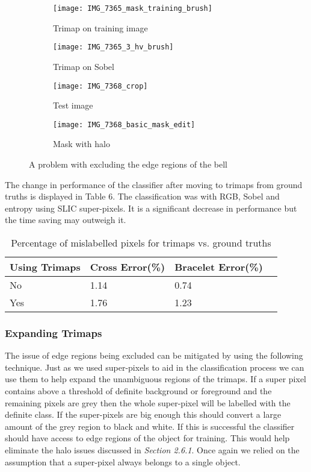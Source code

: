 \documentclass[12pt]{IIBproject}
\begin{document}
\begin{figure}[H]
\centering
\begin{subfigure}{.45\textwidth}
  \centering
  \texttt{[image: IMG\_7365\_mask\_training\_brush]}
  \caption{Trimap on training image}
  \label{fig:sub1}
\end{subfigure}%
\begin{subfigure}{.45\textwidth}
  \centering
  \texttt{[image: IMG\_7365\_3\_hv\_brush]}
  \caption{Trimap on Sobel}
  \label{fig:sub2}
\end{subfigure}
\begin{subfigure}{.45\textwidth}
  \centering
  \texttt{[image: IMG\_7368\_crop]}
  \caption{Test image}
  \label{fig:sub2}
\end{subfigure}
\begin{subfigure}{.45\textwidth}
  \centering
  \texttt{[image: IMG\_7368\_basic\_mask\_edit]}
  \caption{Mask with halo}
  \label{fig:sub2}
\end{subfigure}
\caption{A problem with excluding the edge regions of the bell}
\label{fig:test}
\end{figure}
The change in performance of the classifier after moving to trimaps from ground truths is displayed in Table 6. The classification was with RGB, Sobel and entropy using SLIC super-pixels. It is a significant decrease in performance but the time saving may outweigh it.
\begin{table}
\begin{center}
    \begin{tabular}{ | l | l | l | p{5cm} |}
    \hline
    Using Trimaps & Cross Error(\%) & Bracelet Error(\%) \\ \hline
    No & 1.14 & 0.74 \\ \hline
    Yes & 1.76 & 1.23 \\
    \hline
    
    \end{tabular}
    \caption{Percentage of mislabelled pixels for trimaps vs. ground truths}\label{table:somename}
\end{center}
\end{table}




\subsubsection{Expanding Trimaps}
The issue of edge regions being excluded can be mitigated by using the following technique. Just as we used super-pixels to aid in the classification process we can use them to help expand the unambiguous regions of the trimaps. If a super pixel contains above a threshold of definite background or foreground and the remaining pixels are grey then the whole super-pixel will be labelled with the definite class. If the super-pixels are big enough this should convert a large amount of the grey region to black and white. If this is successful the classifier should have access to edge regions of the object for training. This would help eliminate the halo issues discussed in \emph{Section 2.6.1}. Once again we relied on the assumption that a super-pixel always belongs to a single object.  
\end{document}
